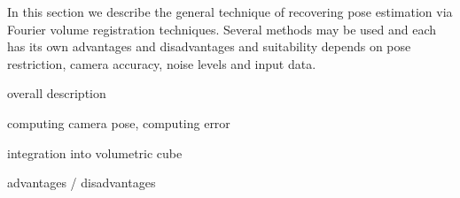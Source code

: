 
In this section we describe the general technique of recovering pose estimation via Fourier volume registration techniques. Several methods may be used and each has its own advantages and disadvantages and suitability depends on pose restriction, camera accuracy, noise levels and input data. 


overall description

computing camera pose, computing error

integration into volumetric cube

advantages / disadvantages
